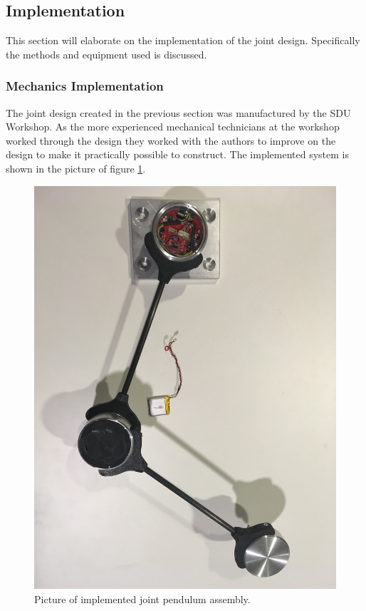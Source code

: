 \subsection{Implementation} %
\label{sub:implementation_and_verification}
This section will elaborate on the implementation of the joint design.
Specifically the methods and equipment used is discussed.
\subsubsection{Mechanics Implementation} %
\label{ssub:mechanics_implementation}
The joint design created in the previous section was manufactured by the SDU Workshop.
As the more experienced mechanical technicians at the workshop worked through the design they worked with the authors to improve on the design to make it practically possible to construct.
The implemented system is shown in the picture of figure \ref{fig:joint_ass_real}.

\begin{figure}[h]
	\centering
	\includegraphics[width=0.5\linewidth]{graphics/joint_ass_real}
	\caption[Implemented joint pendulum assembly]{Picture of implemented joint pendulum assembly.}
	\label{fig:joint_ass_real}
\end{figure}
 
